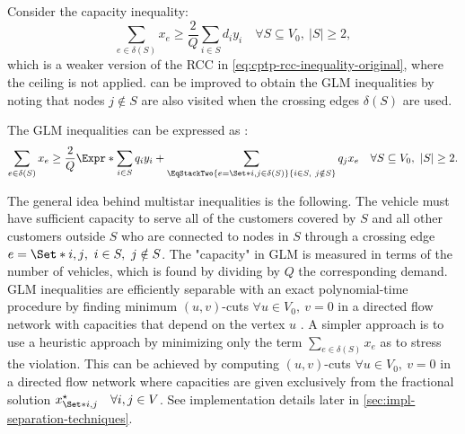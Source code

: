 Consider the capacity inequality:
\begin{equation}
	\label{eq:cptp-weaker-rcc}
	\sum_{e \in \delta(S)} x_e \ge \frac{2}{Q} \sum_{i \in S} d_i y_i \quad \forall S \subseteq V_0,\ |S| \ge 2,
\end{equation}
which is a weaker version of the RCC in \cref{eq:cptp-rcc-inequality-original},
where the ceiling is not applied.
 can be improved to obtain the GLM inequalities
by noting that nodes $j \notin S$ are also visited when the crossing edges $\delta(S)$ are used.

The GLM inequalities can be expressed as \parencite{jepsen2014}:
\begin{equation}
	\label{eq:cptp-glm-inequality}
	\sum\limits_{e \in \delta(S)} x_e \ge \frac{2}{Q} \Expr*{
		\sum\limits_{i \in S} q_i y_i +
		\sum\limits_{\EqStackTwo{e = \Set*{i, j} \in \delta(S)}{i \in S,\ j \notin S}} q_j x_e
	}
	\quad \forall S \subseteq V_0,\ |S| \ge 2.
\end{equation}

The general idea behind multistar inequalities is the following.
The vehicle must have sufficient capacity to serve
all of the customers covered by $S$
and all other customers outside $S$
who are connected to nodes in $S$ through a crossing edge $e = \Set*{i, j},\ i \in S,\ j \notin S$.
The "capacity" in GLM is measured in terms of the number of vehicles,
which is found by dividing by $Q$ the corresponding demand.
GLM inequalities are efficiently separable with
an exact polynomial-time procedure by finding minimum
$(u, v)$-cuts $\forall u \in V_0,\ v = 0$
in a directed flow network with capacities that depend on the vertex $u$
\parencite{letchford2006, jepsen2014}.
A simpler approach is to use a heuristic approach
by minimizing only the term $\sum_{e \in \delta(S)} x_e$ as to stress the violation.
This can be achieved by computing $(u, v)$-cuts $\forall u \in V_0,\ v = 0$
in a directed flow network where capacities are given exclusively from the
fractional solution $x^\star_{\Set*{i, j}} \quad \forall i, j \in V$.
See implementation details later in \cref{sec:impl-separation-techniques}.

